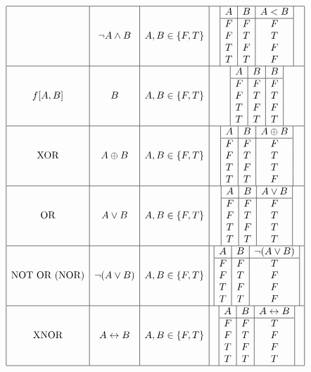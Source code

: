 \documentclass[11pt]{article}
\begin{document}
\newpage
\[
\begin{array}{|c|c|c|c|}
\hline
\text{} & \lnot A \land B & A, B \in \{F, T\} & \begin{array}{|c|c|c|}
A & B & A < B \\
\hline
F & F & F \\
F & T & T \\
T & F & F \\
T & T & F \\
\end{array} \\
\hline
f[A, B] & B & A, B \in \{F, T\} & \begin{array}{|c|c|c|}
A & B & B \\
\hline
F & F & F \\
F & T & T \\
T & F & F \\
T & T & T \\
\end{array} \\
\hline
\text{XOR} & A \oplus B & A, B \in \{F, T\} & \begin{array}{|c|c|c|}
A & B & A \oplus B \\
\hline
F & F & F \\
F & T & T \\
T & F & T \\
T & T & F \\
\end{array} \\
\hline
\text{OR} & A \lor B & A, B \in \{F, T\} & \begin{array}{|c|c|c|}
A & B & A \lor B \\
\hline
F & F & F \\
F & T & T \\
T & F & T \\
T & T & T \\
\end{array} \\
\hline
\text{NOT OR (NOR)} & \neg (A \lor B) & A, B \in \{F, T\} & \begin{array}{|c|c|c|}
A & B & \neg (A \lor B) \\
\hline
F & F & T \\
F & T & F \\
T & F & F \\
T & T & F \\
\end{array} \\
\hline
\text{XNOR} & A \leftrightarrow B & A, B \in \{F, T\} & \begin{array}{|c|c|c|}
A & B & A \leftrightarrow B \\
\hline
F & F & T \\
F & T & F \\
T & F & F \\
T & T & T \\
\end{array} \\
\hline
\end{array}
\]
\end{document}
